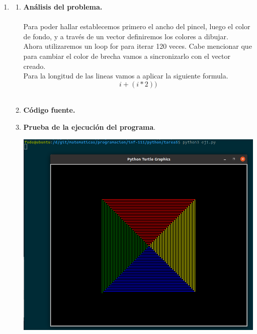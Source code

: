 \begin{enumerate}

\item  
\begin{enumerate}[\bfseries a)]
    
    \item \textbf{Análisis del problema.}\\\\
	Para poder hallar establecemos primero el ancho del pincel, luego el color de fondo, y a través de un vector definiremos los colores a dibujar.\\
	Ahora utilizaremos un loop for para iterar 120 veces. Cabe mencionar que para cambiar el color de brecha vamos a sincronizarlo con el vector creado.\\
	Para la longitud de las lineas vamos a aplicar la siguiente formula.
	$$i+(i*2))$$\\

    \item \textbf{Código fuente.}\\ 
	
	
	\vspace{10cm}
    
    \item \textbf{Prueba de la ejecución del programa}.\\
	\begin{center}
	    \includegraphics[scale=.5]{imagenes/tarea5/ej1.png}
	\end{center}


\end{enumerate}
\end{enumerate}
